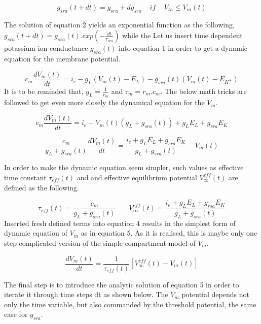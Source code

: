 \documentclass{article}
\begin{document}
\begin{equation}
 g_{sra}(t+dt)=g_{sra}+dg_{sra}\,\,\,\,\,\,\,if\,\,\,\,\,\,\,V_{th} \le V_{m}(t)
\end{equation}

The solution of equation 2 yields an exponential function as the following, $g_{sra}(t+dt)=g_{sra}(t).exp(-\frac{dt}{\tau_{sra}})$ while the Let us insert time dependent potassium ion conductance $g_{sra}(t)$ into equation 1 in order to get a dynamic equation for the membrane potential. 

\begin{equation}
 c_{m}\frac{dV_{m}(t)}{dt}=i_{e}-g_{L}(V_{m}(t)-E_{L})-g_{sra}(t)(V_{m}(t)-E_{K^{+}})
\end{equation}
It is to be reminded that, $g_{L}=\frac{1}{r_{m}}$ and $\tau_{m}=r_{m}.c_{m}$. The below math tricks are followed to get even more closely the dynamical equation for the $V_{m}$.


\begin{equation*}
c_{m}\frac{dV_{m}(t)}{dt}=i_{e}-V_{m}(t)(g_{L}+g_{sra}(t))+g_{L}E_{L}+g_{sra}E_{K}
\end{equation*}

\begin{equation*}
\frac{c_{m}}{g_{L}+g_{sra}(t)}\frac{dV_{m}(t)}{dt}=\frac{i_{e}+g_{L}E_{L}+g_{sra}E_{K}}{g_{L}+g_{sra}(t)}-V_{m}(t)
\end{equation*}

In order to make the dynamic equation seem simpler, such values as effective time constant $\tau_{eff}(t)$ and and effective equilibrium potential $V_{\infty}^{eff}(t)$ are defined as the following.

\begin{equation*}
 \tau_{eff}(t)=\frac{c_{m}}{g_{L}+g_{sra}(t)} \,\,\,\,\,\,\,\,\,\,\,V_{\infty}^{eff}(t)=\frac{i_{e}+g_{L}E_{L}+g_{rsa}E_{K}}{g_{L}+g_{sra}(t)}
\end{equation*}
Inserted fresh defined terms into equation 4 results in the simplest form of dynamic equation of $V_{m}$ as in equation 5. As it is realised, this is maybe only one step complicated version of the simple compartment model of $V_{m}$.

\begin{equation}
 \frac{dV_{m}(t)}{dt}=\frac{1}{\tau_{eff}(t)}[V_{\infty}^{eff}(t)-V_{m}(t)]
\end{equation}

The final step is to introduce the analytic solution of equation 5 in order to iterate it through time steps dt as shown below. The $V_{m}$ potential depends not only the time variable, but also commanded by the threshold potential, the same case for $g_{sra}$. 
\end{document}
